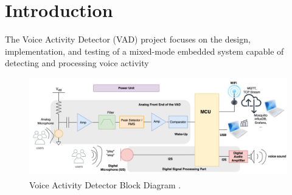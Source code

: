 \section{Introduction}

The Voice Activity Detector (VAD) project focuses on the design, implementation, and testing of a mixed-mode embedded system capable of detecting and processing voice activity

\begin{figure}[H]
    \centering
    \includegraphics*[scale = 0.3]{Images/VADBlockDiagram.png}
    \caption{Voice Activity Detector Block Diagram \textsuperscript{\cite{Lab-statement}} .}
    \label{fig:VADBlockDiagram}
\end{figure}